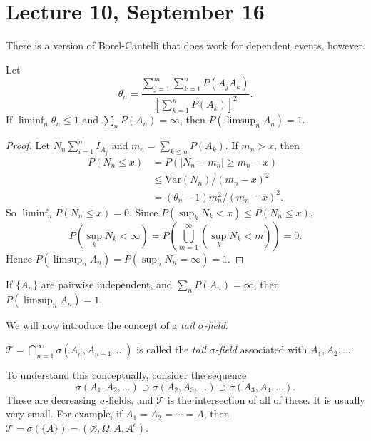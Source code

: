 \documentclass[11pt,fleqn]{book} %
\begin{document}
\section{Lecture 10, September 16}

There is a version of Borel-Cantelli that does work for dependent events, however.

\begin{theorem} \label{thm:borel-cantelli-dependent}
	Let
	\[
		\theta_n = \frac{\sum_{j=1}^m \sum_{k=1}^n P(A_jA_k)}{\left[ \sum_{k=1}^n P(A_k) \right]^2}.
	\]
	If $\liminf_n \theta_n \leq 1$ and $\sum_n P(A_n) = \infty$, then $P(\limsup_n A_n) = 1$.
\end{theorem}

\begin{proof}
	Let $N_n \sum_{i=1}^n I_{A_j}$ and $m_n = \sum_{k \leq n} P(A_k)$. If $m_n > x$, then
	\begin{align*}
		P(N_n \leq x) &= P(|N_n - m_n| \geq m_n - x) \\
		&\leq \textrm{Var}(N_n)/(m_n - x)^2 \tag{Chebyshev} \\
		&= (\theta_n - 1)m_n^2/(m_n-x)^2. \tag{$N_n$ is binomial}
	\end{align*}
	So $\liminf_n P(N_n \leq x) = 0$. Since $P(\sup_k N_k < x) \leq P(N_n \leq x)$,
	\[
		P(\sup_k N_k < \infty) = P(\bigcup_{m=1}^\infty (\sup_k N_k < m)) = 0.
	\]
	Hence $P(\limsup_n A_n) = P(\sup_n N_n = \infty) = 1$.
\end{proof}

\begin{corollary}
	If $\{A_n\}$ are pairwise independent, and $\sum_n P(A_n) = \infty$, then $P(\limsup_n A_n) = 1$.
\end{corollary}

We will now introduce the concept of a \emph{tail $\sigma$-field}.

\begin{definition} \label{def:tail-field}
	$\mathcal{T} = \bigcap_{n=1}^\infty \sigma(A_n,A_{n+1},\dots)$ is called the \emph{tail $\sigma$-field} associated with $A_1,A_2,\dots$.
\end{definition}

To understand this conceptually, consider the sequence
\[
	\sigma(A_1,A_2,\dots) \supset \sigma(A_2,A_3,\dots) \supset \sigma(A_3,A_4,\dots).
\]
These are decreasing $\sigma$-fields, and $\mathcal{T}$ is the intersection of all of these. It is usually very small. For example, if $A_1=A_2=\cdots=A$, then $\mathcal{T} = \sigma(\{A\}) = (\varnothing, \Omega, A, A^c)$.
\end{document}
